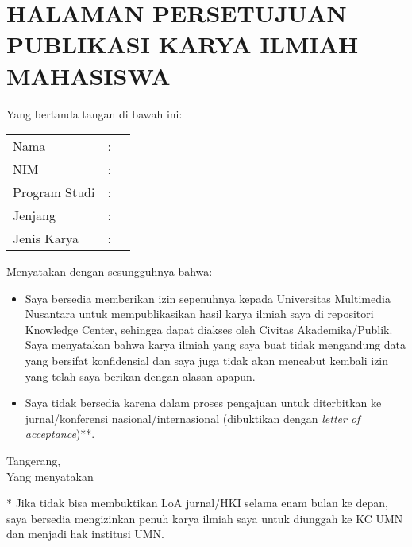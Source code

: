 \chapter*{HALAMAN PERSETUJUAN PUBLIKASI KARYA ILMIAH MAHASISWA}

\onehalfspacing

\noindent 
Yang bertanda tangan di bawah ini:

\begin{tabular}{p{3.7cm} l p{6.5cm}}
	Nama & : & \penulis \\ 	
	NIM & : & \nim \\
	Program Studi & : & \program\\	
	Jenjang & : & \jenjang\\
	Jenis Karya & : & \type \\
\end{tabular}

\noindent Menyatakan dengan sesungguhnya bahwa:
\begin{itemize}
    \renewcommand{\labelitemi}{${\rlap{\hspace{0.1em}$\checkmark$}}\square$}
    \item Saya bersedia memberikan izin sepenuhnya kepada Universitas Multimedia Nusantara untuk mempublikasikan hasil karya ilmiah saya di repositori Knowledge Center, sehingga dapat diakses oleh Civitas Akademika/Publik. Saya menyatakan bahwa karya ilmiah yang saya buat tidak mengandung data yang bersifat konfidensial dan saya juga tidak akan mencabut kembali izin yang telah saya berikan dengan alasan apapun.

    \renewcommand{\labelitemi}{$\square$}
    \item Saya tidak bersedia karena dalam proses pengajuan untuk diterbitkan ke jurnal/konferensi nasional/internasional (dibuktikan dengan \textit{letter of acceptance})**.
\end{itemize}

\begin{flushright}
Tangerang, \tanggalPengumpulan \\
Yang menyatakan\\[2.5cm]
\noindent
\penulis
\end{flushright}

\onehalfspacing

\vfill
{
\footnotesize
\noindent ** Jika tidak bisa membuktikan LoA jurnal/HKI selama enam bulan ke depan, saya bersedia mengizinkan penuh karya ilmiah saya untuk diunggah ke KC UMN dan menjadi hak institusi UMN.
}
\newpage